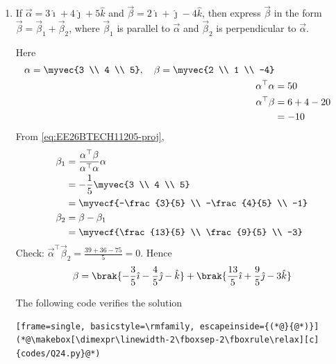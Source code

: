\begin{enumerate}[label=\thesubsection.\arabic*, ref=\thesubsection.\theenumi, itemsep=3ex]
\item
If $\vec{\alpha} = 3\hat{\imath} + 4\hat{\jmath} + 5\hat{k}$ and $\vec{\beta} = 2\hat{\imath} + \hat{\jmath} - 4\hat{k}$, then express $\vec{\beta}$ in the form $\vec{\beta} = \vec{\beta}_1 + \vec{\beta}_2$, where $\vec{\beta}_1$ is parallel to $\vec{\alpha}$ and $\vec{\beta}_2$ is perpendicular to $\vec{\alpha}$.

\medskip
\solution Here
\begin{align}
	\vec{\alpha} = \myvec{3 \\ 4 \\ 5},\quad \vec{\beta} = \myvec{2 \\ 1 \\ -4}
	\\
	\vec{\alpha}^{\top}\vec{\alpha} &= 50
	\\
	\vec{\alpha}^{\top}\vec{\beta} &= 6 + 4 - 20 \notag
	\\
	&= -10
\end{align}
From \eqref{eq:EE26BTECH11205-proj},
\begin{align}
	\vec{\beta}_1 &= \frac{\vec{\alpha}^{\top}\vec{\beta}}{\vec{\alpha}^{\top}\vec{\alpha}}\vec{\alpha} \notag
	\\
	&= -\frac{1}{5}\myvec{3 \\ 4 \\ 5} \notag
	\\
	&= \myvecf{-\frac{3}{5} \\ -\frac{4}{5} \\ -1}
	\\
	\vec{\beta}_2 &= \vec{\beta} - \vec{\beta}_1 \notag
	\\
	&= \myvecf{\frac{13}{5} \\ \frac{9}{5} \\ -3}
\end{align}
Check: $\vec{\alpha}^{\top}\vec{\beta}_2 = \frac{39 + 36 - 75}{5} = 0$. Hence
\begin{align}
	\vec{\beta} = \brak{-\frac{3}{5}\hat{\imath} - \frac{4}{5}\hat{\jmath} - \hat{k}} + \brak{\frac{13}{5}\hat{\imath} + \frac{9}{5}\hat{\jmath} - 3\hat{k}}
\end{align}

\medskip
The following code verifies the solution
\begin{lstlisting}[frame=single, basicstyle=\rmfamily, escapeinside={(*@}{@*)}]
(*@\makebox[\dimexpr\linewidth-2\fboxsep-2\fboxrule\relax][c]{codes/Q24.py}@*)
\end{lstlisting}


\end{enumerate}
